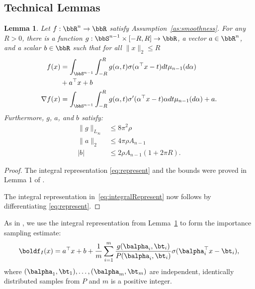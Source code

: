 \documentclass[letterpaper, 10 pt, conference]{ieeeconf}  %
\newtheorem{lemma}{Lemma}
\begin{document}
\subsection{Technical Lemmas}
\begin{lemma}
  \label{lem:integral}
  {\it
    Let $f:\bbR^n\to \bbR$ satisfy Assumption~\ref{as:smoothness}. For any $R>0$, 
    there is a function $g:\bbS^{n-1}\times [-R,R]\to \bbR$, a vector $a\in\bbR^n$, and a scalar $b\in\bbR$ such that for all $\|x\|_2\le R$
  \begin{subequations}
  \begin{align}
    \label{eq:represent}
    \nonumber
    f(x)&=\int_{\bbS^{n-1}}\int_{-R}^R g(\alpha,t)\sigma(\alpha^\top x-t)  dt \mu_{n-1}(d\alpha) \\
        &+a^\top x +b \\
    \label{eq:integralRepresent}
    \nabla f(x)&= \int_{\bbS^{n-1}}\int_{-R}^R g(\alpha,t)\sigma'(\alpha^\top x-t)\alpha  dt \mu_{n-1}(d\alpha) +a.
  \end{align}
\end{subequations}
Furthermore, $g$, $a$, and $b$ satisfy:
\begin{align*}
  \|g\|_{L_{\infty}}&\le 8\pi^2\rho \\
  \|a\|_2&\le 4\pi \rho A_{n-1}\\
  |b|&\le 2\rho A_{n-1}\left( 1+2\pi R\right). 
\end{align*}
  }
\end{lemma}

\begin{proof}
  The integral representation  \eqref{eq:represent} and the bounds were proved in Lemma 1 of \cite{lamperski2024approximation}.
  
 

  The integral representation in~\ref{eq:integralRepresent} now follows by differentiating \eqref{eq:represent}.  
\end{proof}


As in \cite{lamperski2024approximation}, we use the integral representation from Lemma~\ref{lem:integral} to form the importance sampling estimate:
\begin{align}
  \label{eq:importance}
  \boldf_I(x)=a^\top x + b + \frac{1}{m}\sum_{i=1}^m\frac{g(\balpha_i,\bt_i)}{P(\balpha_i,\bt_i)}\sigma(\balpha_i^\top x-\bt_i),
\end{align}
where $(\balpha_1,\bt_1),\ldots,(\balpha_m,\bt_m)$ are independent, identically distributed samples from $P$ and $m$ is a positive integer.
\end{document}
